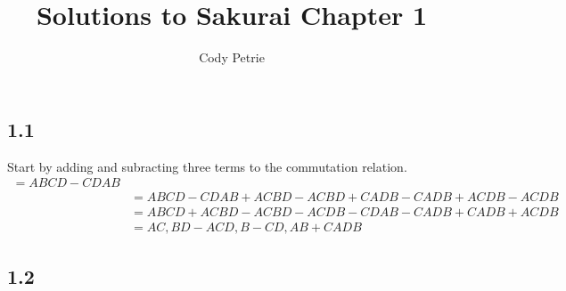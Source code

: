 \documentclass[12pt]{extarticle}
\title{Solutions to Sakurai Chapter 1}
\author{Cody Petrie}
\begin{document}
\maketitle

\subsection*{1.1}
Start by adding and subracting three terms to the commutation relation.
\begin{align}
   [A&B,CD] = ABCD-CDAB \\
      &= ABCD-CDAB + ACBD-ACBD + CADB-CADB + ACDB-ACDB \\
      &= ABCD+ACBD - ACBD-ACDB - CDAB-CADB + CADB+ACDB \\
      &= A{C,B}D - AC{D,B} - C{D,A}B + {CA}DB
\end{align}

\subsection*{1.2}
\end{document}
